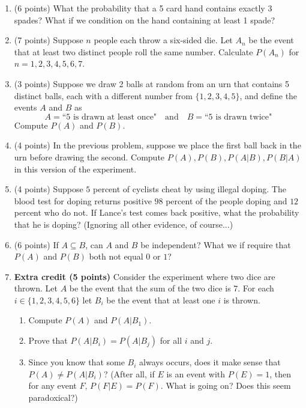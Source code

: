 \documentclass[11pt]{article}
\begin{document}
\begin{enumerate}

\item (6 points) What the probability that a 5 card hand contains exactly 3
spades?  What if we condition on the hand containing at least 1 spade?

\item (7 points) Suppose $n$ people each throw a six-sided die.  Let $A_n$ be
the event that at least two distinct people roll the same number.  Calculate
$P(A_n)$ for $n=1,2,3,4,5,6,7$.

\item (3 points) Suppose we draw 2 balls at random from an urn that contains 5 distinct
balls, each with a different number from $\{1,2,3,4,5\}$, and define the events
$A$ and $B$ as
\[
A = \text{``5 is drawn at least once"} \quad \text{and} \quad
B = \text{``5 is drawn twice"} 
\]
Compute $P(A)$ and $P(B)$.

\item (4 points) In the previous problem, suppose we place the first ball back
in the urn before drawing the second.  Compute $P(A),P(B),P(A|B),P(B|A)$ in
this version of the experiment.


\item (4 points) Suppose $5$ percent of cyclists cheat by using illegal doping.
The blood test for doping returns positive $98$ percent of the people
doping and $12$ percent who do not.  If Lance's test comes back positive,
what the probability that he is doping? (Ignoring all other evidence,
of course...)

\item (6 points) If $A \subseteq B$, can $A$ and $B$ be independent?  What we
if require that $P(A)$ and $P(B)$ both not equal $0$ or $1$?

\item \textbf{Extra credit (5 points)}  Consider the experiment where two dice
are thrown. Let $A$ be the event that the sum of the two dice is 7. For each 
$i \in \{1,2,3,4,5,6\}$  let $B_i$ be the event that at least one $i$ is thrown.
\begin{enumerate}
\item Compute $P(A)$ and $P(A|B_1)$.
\item Prove that $P(A|B_i) = P(A|B_j)$ for all $i$ and $j$.
\item Since you know that some $B_i$ always occurs, does it make sense that
$P(A) \neq P(A | B_i)$?  (After all, if $E$ is an event with $P(E) = 1$,
then for any event $F$, $P(F|E) = P(F)$.  What is going on?  Does this
seem paradoxical?)
\end{enumerate}

\end{enumerate}
\end{document}

